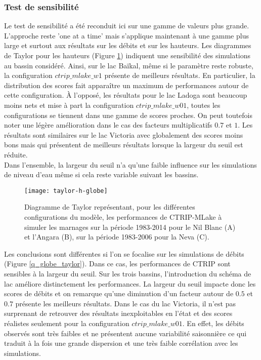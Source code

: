 \subsubsection*{{\selectfont Test de sensibilité}}
Le test de sensibilité a été reconduit ici sur une gamme de valeurs plus grande. L'approche reste 'one at a time' mais s'applique maintenant à une gamme plus large et surtout aux résultats sur les débits et sur les hauteurs.
Les diagrammes de Taylor pour les hauteurs (Figure \ref{h_globe_taylor}) indiquent une sensibilité des simulations au bassin considéré. Ainsi, sur le lac Baïkal, même si le paramètre reste robuste, la configuration $ctrip\_mlake\_w1$ présente de meilleurs résultats. En particulier, la distribution des scores fait apparaître un maximum de performances autour de cette configuration.
À l'opposé, les résultats pour le lac Ladoga sont beaucoup moins nets et mise à part la configuration $ctrip\_mlake\_w01$, toutes les configurations se tiennent dans une gamme de scores proches. On peut toutefois noter une légère amélioration dans le cas des facteurs multiplicatifs $0.7$ et $1$. Les résultats sont similaires sur le lac Victoria avec globalement des scores moins bons mais qui présentent de meilleurs résultats lorsque la largeur du seuil est réduite.\\
Dans l'ensemble, la largeur du seuil n'a qu'une faible influence sur les simulations de niveau d'eau même si cela reste variable suivant les bassins. \\

\begin{figure}[h!]
\texttt{[image: taylor-h-globe]}
\caption{Diagramme de Taylor représentant, pour les différentes configurations du modèle, les performances de CTRIP-MLake à simuler les marnages sur la période 1983-2014 pour le Nil Blanc (A) et l'Angara (B), sur la période 1983-2006 pour la Neva (C).}
\label{h_globe_taylor}
\end{figure}

Les conclusions sont différentes si l'on se focalise sur les simulations de débits (Figure \ref{q_globe_taylor}). Dans ce cas, les performances de CTRIP sont sensibles à la largeur du seuil. Sur les trois bassins, l'introduction du schéma de lac améliore distinctement les performances. La largeur du seuil impacte donc les scores de débits et on remarque qu'une diminution d'un facteur autour de $0.5$ et $0.7$ présente les meilleurs résultats. Dans le cas du lac Victoria, il n'est pas surprenant de retrouver des résultats inexploitables en l'état et des scores réalistes seulement pour la configuration $ctrip\_mlake\_w01$. En effet, les débits observés sont très faibles et ne présentent aucune variabilité saisonnière ce qui traduit à la fois une grande dispersion et une très faible corrélation avec les simulations.

